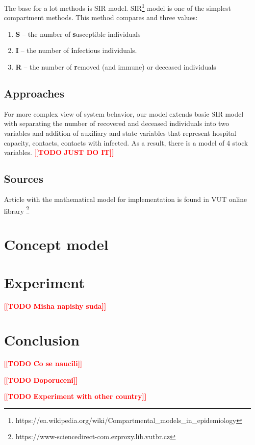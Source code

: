 \documentclass[12pt,a4paper,english]{article}
\newcommand{\todo}[1]{\textcolor{red}{[[\textbf{TODO} \textbf{#1]]}}}
\begin{document}
    The base for a lot methods is SIR model. 
    SIR\footnote{https://en.wikipedia.org/wiki/Compartmental\_models\_in\_epidemiology} model is one of the simplest compartment methods. 
    This method compares and three values:
    \begin{enumerate}
        \item \textbf{S} -- the number of \textbf{s}usceptible individuals
        \item \textbf{I} -- the number of \textbf{i}nfectious individuals.
        \item \textbf{R} -- the number of \textbf{r}emoved (and immune) or deceased individuals
    \end{enumerate} 

    \subsection{Approaches}
    For more complex view of system behavior, our model extends basic SIR model with separating the number of recovered and deceased individuals into two variables and addition of auxiliary and state variables that represent hospital capacity, contacts, contacts with infected. 
    As a result, there is a model of 4 stock variables.
    \todo{JUST DO IT}
    \subsection{Sources}
    Article with the mathematical model \cite{math_article} for implementation is 
    found in VUT online library \footnote{https://www-sciencedirect-com.ezproxy.lib.vutbr.cz}

    \section{Concept model}
    
    \section{Experiment}
    
    \todo{Misha napishy suda}

    \section{Conclusion}
    \todo{Co se naucili}
    
    \todo{Doporuceni}

    \todo{Experiment with other country}

    \clearpage
	
	
\end{document}

